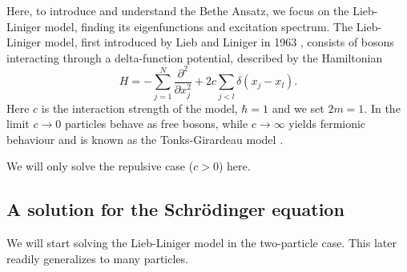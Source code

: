 \documentclass[11pt, a4paper,draft]{report} %
\begin{document}
Here, to introduce and understand the Bethe Ansatz, we focus on the Lieb-Liniger model, finding its eigenfunctions and excitation spectrum.
The Lieb-Liniger model, first introduced by Lieb and Liniger in 1963 \cite{Lieb1963, Lieb1963a}, consists of bosons interacting through a delta-function potential, described by the Hamiltonian
\begin{equation}
	H = - \sum_{j=1}^{N} \frac{\partial^2}{\partial x_j^2} + 2c \sum_{j<l} \delta(x_j - x_l).
\end{equation}
Here \(c\) is the interaction strength of the model, \(\hbar=1\) and we set \(2m=1\).
In the limit \(c\to0\) particles behave as free bosons, while \(c\to\infty\) yields fermionic behaviour and is known as the Tonks-Girardeau model \cite{Lieb1963, Franchini2017}.

We will only solve the repulsive case (\(c > 0\)) here.

\subsection{A solution for the Schrödinger equation}

We will start solving the Lieb-Liniger model in the two-particle case. This later readily generalizes to many particles.
\end{document}
